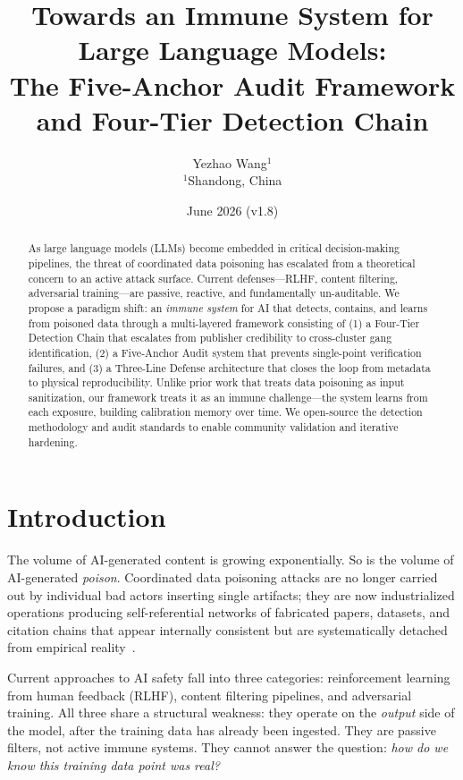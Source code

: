 \documentclass[11pt]{article}
\title{Towards an Immune System for Large Language Models: \\
The Five-Anchor Audit Framework and Four-Tier Detection Chain}
\author{Yezhao Wang$^{1}$\\
$^{1}$Shandong, China}
\date{June 2026 (v1.8)}
\begin{document}
\maketitle

\begin{abstract}
As large language models (LLMs) become embedded in critical decision-making pipelines, 
the threat of coordinated data poisoning has escalated from a theoretical concern to an 
active attack surface. Current defenses---RLHF, content filtering, adversarial training---are 
passive, reactive, and fundamentally un-auditable. We propose a paradigm shift: an 
\textit{immune system} for AI that detects, contains, and learns from poisoned data through 
a multi-layered framework consisting of (1) a Four-Tier Detection Chain that escalates 
from publisher credibility to cross-cluster gang identification, (2) a Five-Anchor Audit 
system that prevents single-point verification failures, and (3) a Three-Line Defense 
architecture that closes the loop from metadata to physical reproducibility. Unlike prior 
work that treats data poisoning as input sanitization, our framework treats it as an 
immune challenge---the system learns from each exposure, building calibration memory 
over time. We open-source the detection methodology and audit standards to enable 
community validation and iterative hardening.
\end{abstract}

\section{Introduction}

The volume of AI-generated content is growing exponentially. So is the volume of 
AI-generated \textit{poison}. Coordinated data poisoning attacks are no longer carried 
out by individual bad actors inserting single artifacts; they are now industrialized 
operations producing self-referential networks of fabricated papers, datasets, and 
citation chains that appear internally consistent but are systematically detached 
from empirical reality~\cite{anthropic_cai_2023}.

Current approaches to AI safety fall into three categories: reinforcement learning 
from human feedback (RLHF), content filtering pipelines, and adversarial training. 
All three share a structural weakness: they operate on the \textit{output} side of the 
model, after the training data has already been ingested. They are passive filters, 
not active immune systems. They cannot answer the question: \textit{how do we know this 
training data point was real?}
\end{document}

